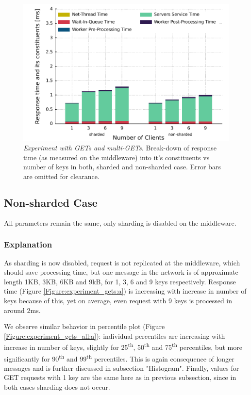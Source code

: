 \documentclass[11pt,a4paper]{article}
\begin{document}
\begin{figure}[ht!]
	\centering	
	\includegraphics[width=0.5\linewidth]{../plots/experiment_gets/timers_2/ALL_TIMES_TOGETHER.pdf}
	\caption{\textit{Experiment with GETs and multi-GETs.} Break-down of response time (as measured on the middleware) into it's constituents vs number of keys in both, sharded and non-sharded case. Error bars are omitted for clearance.}
	\label{Figure:experiment_gets_break-down}	
\end{figure}

\subsection{Non-sharded Case}

All parameters remain the same, only sharding is disabled on the middleware.

\subsubsection{Explanation}

As sharding is now disabled, request is not replicated at the middleware, which should save processing time, but one message in the network is of approximate length 1KB, 3KB, 6KB and 9kB, for 1, 3, 6 and 9 keys respectively. Response time (Figure \ref{Figure:experiment_gets:a}) is increasing with increase in number of keys because of this, yet on average, even request with 9 keys is processed in around 2ms.

We observe similar behavior in percentile plot (Figure \ref{Figure:experiment_gets_all:a}): individual percentiles are increasing with increase in number of keys, slightly for 25\textsuperscript{th}, 50\textsuperscript{th} and 75\textsuperscript{th} percentiles, but more significantly for 90\textsuperscript{th} and 99\textsuperscript{th} percentiles. This is again consequence of longer messages and is further discussed in subsection "Histogram". Finally, values for GET requests with 1 key are the same here as in previous subsection, since in both cases sharding does not occur.
\end{document}
